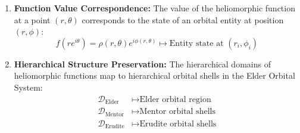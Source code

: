 \begin{theorem}
\begin{enumerate}
    \item \textbf{Function Value Correspondence:} The value of the heliomorphic function at a point $(r,\theta)$ corresponds to the state of an orbital entity at position $(r,\phi)$:
    \begin{equation}
        f(re^{i\theta}) = \rho(r,\theta)e^{i\phi(r,\theta)} \mapsto \text{Entity state at } (r_i,\phi_i)
    \end{equation}
    
    \item \textbf{Hierarchical Structure Preservation:} The hierarchical domains of heliomorphic functions map to hierarchical orbital shells in the Elder Orbital System:
    \begin{align}
        \mathcal{D}_{\text{Elder}} &\mapsto \text{Elder orbital region} \\
        \mathcal{D}_{\text{Mentor}} &\mapsto \text{Mentor orbital shells} \\
        \mathcal{D}_{\text{Erudite}} &\mapsto \text{Erudite orbital shells}
    \end{align}
\end{enumerate}
\end{theorem}

